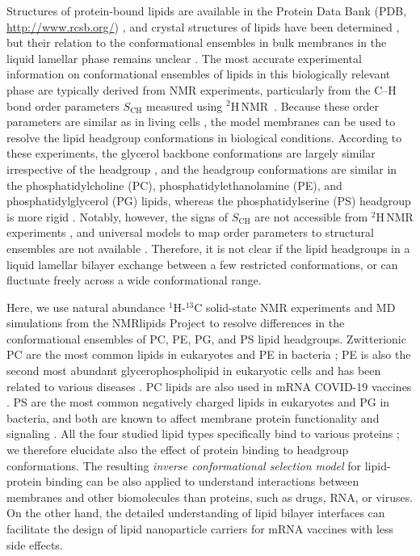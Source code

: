 \documentclass[journal=jpcbfk,manuscript=article]{achemso}
\begin{document}
Structures of protein-bound lipids are available in the Protein Data Bank (PDB, \url{http://www.rcsb.org/}) \cite{berman00},
and crystal structures of lipids have been determined \cite{buldt81,pascher92},
but their relation to the conformational ensembles in bulk membranes in the liquid lamellar phase remains unclear \cite{marsh13b}.
The most accurate experimental information on conformational ensembles of lipids
in this biologically relevant phase are typically derived from NMR experiments, particularly from the
C--H bond order parameters $S_\mathrm{CH}$ measured using $^2$H\,NMR~\cite{seelig77c,davis83,Semchyschyn04}.
Because these order parameters are similar as in living cells \cite{gally81,scherer87,seelig90},
the model membranes can be used to resolve the lipid headgroup conformations in biological conditions.
According to these experiments, the glycerol backbone conformations are largely similar irrespective of the headgroup \cite{gally81}, and
the headgroup conformations are similar in the phosphatidylcholine (PC), phosphatidylethanolamine (PE), and phosphatidylglycerol (PG) lipids,
whereas the phosphatidylserine (PS) headgroup is more rigid \cite{wohlgemuth80,buldt81}. 
Notably, however, the signs of $S_\mathrm{CH}$ are not accessible from $^2$H\,NMR experiments \cite{ollila16},
and universal models to map order parameters to structural ensembles are not available \cite{pezeshkian18,akutsu20}.
Therefore, it is not clear if the lipid headgroups in a liquid lamellar bilayer exchange between a few restricted conformations, or can fluctuate freely across a wide conformational range.

Here, we use natural abundance $^1$H-$^{13}$C solid-state NMR experiments and MD simulations from the NMRlipids Project
to resolve differences in the conformational ensembles of PC, PE, PG, and PS lipid headgroups.
Zwitterionic PC are the most common lipids in eukaryotes and PE in bacteria \cite{vanmeer08,sohlenkamp16};
PE is also the second most abundant glycerophospholipid in eukaryotic cells
and has been related to various diseases \cite{vance15,calzada16,patel17}.
PC lipids are also used in mRNA COVID-19 vaccines \cite{schoenmaker21}.
PS are the most common negatively charged lipids in eukaryotes and PG in bacteria,
and both are known to affect membrane protein functionality and signaling \cite{lemmon08,leventis10,sohlenkamp16,hariharan18}.
All the four studied lipid types specifically bind to various proteins \cite{yeagle14};
we therefore elucidate also the effect of protein binding to headgroup conformations.
The resulting {\it inverse conformational selection model} for lipid-protein binding can be also
applied to understand interactions between membranes and other biomolecules than proteins, such as drugs, RNA, or viruses.
On the other hand, the detailed understanding of lipid bilayer interfaces can facilitate the design
of lipid nanoparticle carriers for mRNA vaccines with less side effects.
\end{document}
